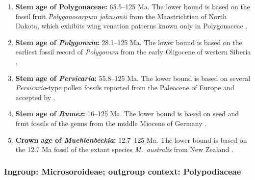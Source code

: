 \begin{enumerate}

\item \textbf{Stem age of Polygonaceae:} 65.5--125 Ma. The lower bound
  is based on the fossil fruit \textit{Polygonocarpum johnsonii} from
  the Maastrichtian of North Dakota, which exhibits wing venation
  patterns known only in Polygonaceae \citep{Manchester2010}.

\item \textbf{Stem age of \textit{Polygonum}:} 28.1--125 Ma. The
  lower bound is based on the earliest fossil record of
  \textit{Polygonum} from the early Oligocene of western Siberia
  \citep{Dorofeev1963}.

\item \textbf{Stem age of \textit{Persicaria}:} 55.8--125 Ma. The
  lower bound is based on several \textit{Persicaria}-type pollen
  fossils reported from the Paleocene of Europe
  \citep{Krutzsch1970,Gruas1978} and accepted by \citet{Muller1981}.

\item \textbf{Stem age of \textit{Rumex}:} 16--125 Ma. The lower
  bound is based on seed and fruit fossils of the genus from the
  middle Miocene of Germany \citep{Mai2001}.

\item \textbf{Crown age of \textit{Muehlenbeckia}:} 12.7--125 Ma. The
  lower bound is based on the 12.7 Ma fossil of the extant species
  \textit{M.~australis} from New Zealand
  \citep{Pole1993,Schuster2013}.

\end{enumerate}

\subsubsection*{Ingroup: Microsoroideae; outgroup context:
  Polypodiaceae}


